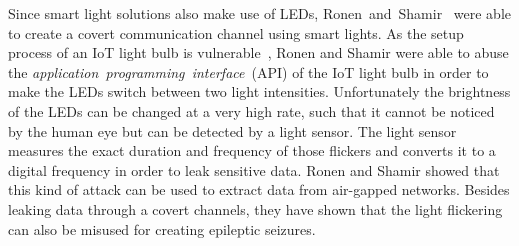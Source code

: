 Since smart light solutions also make use of LEDs, Ronen~and~Shamir~\cite{Ronen:2016:EFAIDCSL} were able to create a covert communication channel using smart lights.
As the setup process of an IoT light bulb is vulnerable~\cite{Dhanjani:2013:HLSEPHPWLS, Morgner:2016:AYBBUICSSCLS, Ronen:2018:IGNCZCR}, Ronen and Shamir were able to abuse the \textit{application~programming~interface}~(API) of the IoT light bulb in order to make the LEDs switch between two light intensities. Unfortunately the brightness of the LEDs can be changed at a very high rate, such that it cannot be noticed by the human eye but can be detected by a light sensor. 
The light sensor measures the exact duration and frequency of those flickers and converts it to a digital frequency in order to leak sensitive data.
Ronen and Shamir showed that this kind of attack can be used to extract data from air-gapped networks.
Besides leaking data through a covert channels, they have shown that the light flickering can also be misused for creating epileptic seizures.